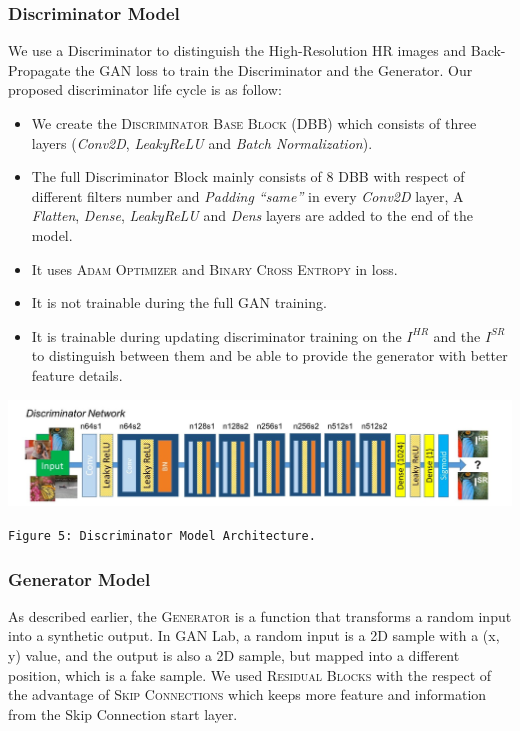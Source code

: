 \documentclass[12pt]{article}
\begin{document}
			\subsubsection{Discriminator Model}
				We use a Discriminator to distinguish the High-Resolution HR images and Back-Propagate the GAN loss to train the Discriminator and the Generator. Our proposed discriminator life cycle is as follow:
				\begin{itemize}
					\item We create the \textsc{Discriminator Base Block (DBB)} which consists of three layers (\textit{Conv2D}, \textit{LeakyReLU} and \textit{Batch Normalization}).
					\item The full Discriminator Block mainly consists of 8 DBB with respect of different filters number and \textit{Padding “same”} in every \textit{Conv2D} layer, A \textit{Flatten}, \textit{Dense}, \textit{LeakyReLU} and \textit{Dens} layers are added to the end of the model.
					\item It uses \textsc{Adam Optimizer} and \textsc{Binary Cross Entropy} in loss.
					\item It is not trainable during the full GAN training.
					\item It is trainable during updating discriminator training on the $I^{HR}$ and the $I^{SR}$ to distinguish between them and be able to provide the generator with better feature details.
				\end{itemize}
				\begin{center}
					\vspace{0.1in}
					\includegraphics[width=6in]{Images/Discriminator.jpeg}
				
					\texttt{Figure 5: Discriminator Model Architecture.}
					\vspace{0.1in}
				\end{center}

			\subsubsection{Generator Model}
				As described earlier, the \textsc{Generator} is a function that transforms a random input into a synthetic output. In GAN Lab, a random input is a 2D sample with a (x, y) value, and the output is also a 2D sample, but mapped into a different position, which is a fake sample. We used \textsc{Residual Blocks} with the respect of the advantage of \textsc{Skip Connections} which keeps more feature and information from the Skip Connection start layer.
					
\end{document}
